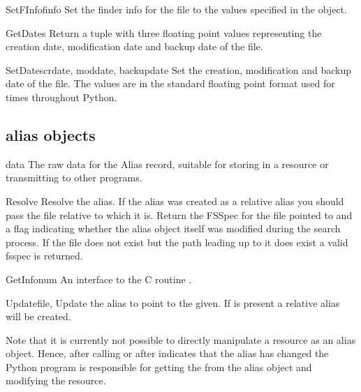 \begin{funcdesc}{SetFInfo}{finfo}
Set the finder info for the file to the values specified in the
 object.
\end{funcdesc}

\begin{funcdesc}{GetDates}{}
Return a tuple with three floating point values representing the
creation date, modification date and backup date of the file.
\end{funcdesc}

\begin{funcdesc}{SetDates}{crdate, moddate, backupdate}
Set the creation, modification and backup date of the file. The values
are in the standard floating point format used for times throughout
Python.
\end{funcdesc}

\subsection{alias objects}

\begin{datadesc}{data}
The raw data for the Alias record, suitable for storing in a resource
or transmitting to other programs.
\end{datadesc}

\begin{funcdesc}{Resolve}{}
Resolve the alias. If the alias was created as a relative alias you
should pass the file relative to which it is. Return the FSSpec for
the file pointed to and a flag indicating whether the alias object
itself was modified during the search process. If the file does
not exist but the path leading up to it does exist a valid fsspec
is returned.
\end{funcdesc}

\begin{funcdesc}{GetInfo}{num}
An interface to the C routine .
\end{funcdesc}

\begin{funcdesc}{Update}{file, }
Update the alias to point to the  given. If  is
present a relative alias will be created.
\end{funcdesc}

Note that it is currently not possible to directly manipulate a resource
as an alias object. Hence, after calling  or after
 indicates that the alias has changed the Python program
is responsible for getting the  from the alias object and
modifying the resource.


